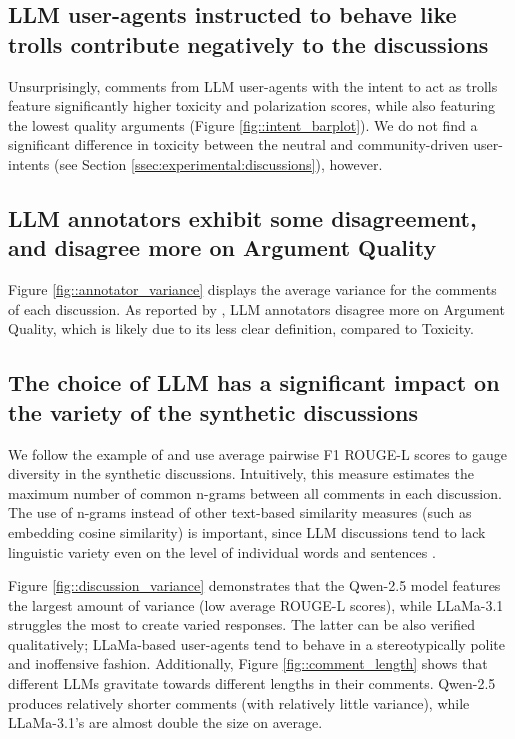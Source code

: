 \subsection{LLM user-agents instructed to behave like trolls contribute negatively to the discussions}

Unsurprisingly, comments from \ac{LLM} user-agents with the intent to act as trolls feature significantly higher toxicity and polarization scores, while also featuring the lowest quality arguments (Figure \ref{fig::intent_barplot}). We do not find a significant difference in toxicity between the neutral and community-driven user-intents (see Section \ref{ssec:experimental:discussions}), however.


\subsection{LLM annotators exhibit some disagreement, and disagree more on Argument Quality}

Figure \ref{fig::annotator_variance} displays the average variance for the comments of each discussion. As reported by \citet{argyle2023}, \ac{LLM} annotators disagree more on Argument Quality, which is likely due to its less clear definition, compared to Toxicity.


\subsection{The choice of LLM has a significant impact on the variety of the synthetic discussions}

We follow the example of \citet{ulmer2024bootstrappingllmbasedtaskorienteddialogue} and use average pairwise F1 ROUGE-L scores \cite{lin-2004-rouge} to gauge diversity in the synthetic discussions. Intuitively, this measure estimates the maximum number of common n-grams between all comments in each discussion. The use of n-grams instead of other text-based similarity measures (such as embedding cosine similarity) is important, since \ac{LLM} discussions tend to lack linguistic variety even on the level of individual words and sentences \cite{ulmer2024bootstrappingllmbasedtaskorienteddialogue}. 

Figure \ref{fig::discussion_variance} demonstrates that the Qwen-2.5 model features the largest amount of variance (low average ROUGE-L scores), while LLaMa-3.1 struggles the most to create varied responses. The latter can be also verified qualitatively; LLaMa-based user-agents tend to behave in a stereotypically polite and inoffensive fashion. Additionally, Figure \ref{fig::comment_length} shows that different \acp{LLM} gravitate towards different lengths in their comments. Qwen-2.5 produces relatively shorter comments (with relatively little variance), while LLaMa-3.1's are almost double the size on average.

